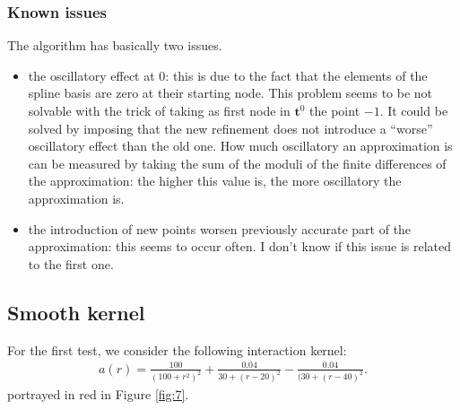 \documentclass[A4paper,11pt]{article}
\theoremstyle{definition}
\begin{document}
\subsubsection{Known issues}

The algorithm has basically two issues.
\begin{itemize}
\item the oscillatory effect at $0$: this is due to the fact that the elements of the spline basis are zero at their starting node. This problem seems to be not solvable with the trick of taking as first node in $\mathbf{t}^0$ the point $-1$. It could be solved by imposing that the new refinement does not introduce a ``worse'' oscillatory effect than the old one. How much oscillatory an approximation is can be measured by taking the sum of the moduli of the finite differences of the approximation: the higher this value is, the more oscillatory the approximation is.
\item the introduction of new points worsen previously accurate part of the approximation: this seems to occur often. I don't know if this issue is related to the first one.
\end{itemize}

\subsection{Smooth kernel}

For the first test, we consider the following interaction kernel:
\begin{align*}
a(r) = \frac{100}{(100+r^2)^2} + \frac{0.04}{30 + (r - 20)^2} - \frac{0.04}{(30 + (r - 40)^2}.
\end{align*}
portrayed in red in Figure \ref{fig:7}.
\end{document}
